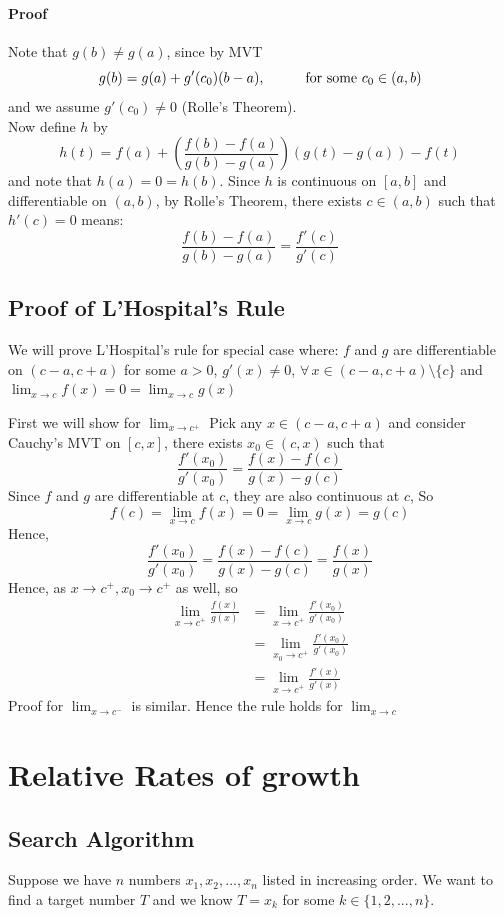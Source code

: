 \documentclass[12pt]{article}
\newcommand\tab[1][1cm]{\hspace*{#1}}
\begin{document}
\paragraph{Proof}
Note that $g(b) \neq g(a)$, since by MVT
\[
    g(b) = g(a) + g'(c_0)(b - a), \textrm{\tab for some } c_0 \in (a, b)
\]
and we assume $g'(c_0) \neq 0$ (Rolle's Theorem). \\
Now define $h$ by 
\[
    h(t) = f(a) + \left(\frac{f(b) - f(a)}{g(b) - g(a)} \right)(g(t) - g(a)) - f(t)
\]
and note that $h(a) = 0 = h(b)$. Since $h$ is continuous on $[a, b]$ and differentiable on $(a, b)$, by 
Rolle's Theorem, there exists $c \in (a, b)$ such that $h'(c) = 0$ means:
\[
    \frac{f(b) - f(a)}{g(b) - g(a)} = \frac{f'(c)}{g'(c)} 
\]
\subsection{Proof of L'Hospital's Rule}
We will prove L'Hospital's rule for special case where: $f$ and $g$ are differentiable on $(c - a, c + a)$ for some $a > 0$,
$g'(x) \neq 0$, $\forall \, x \in (c- a, c + a)\setminus\{c\}$ and $\lim_{x \to c} f(x) = 0 = \lim_{x \to c} g(x)$

\noindent
First we will show for $\lim_{x \to c^+}$ Pick any $x \in (c - a, c + a)$ and consider Cauchy's MVT on $[c, x]$, there exists $x_0 \in (c, x)$ such that
\[
    \frac{f'(x_0)}{g'(x_0)} = \frac{f(x) - f(c)}{g(x) - g(c)} 
\]
Since $f$ and $g$ are differentiable at $c$, they are also continuous at $c$, So
\[
    f(c) = \lim_{x \to c} f(x) = 0 = \lim_{x \to c} g(x) = g(c)
\]
Hence, 
\[
    \frac{f'(x_0)}{g'(x_0)} = \frac{f(x) - f(c)}{g(x) - g(c)} = \frac{f(x)}{g(x)} 
\]
Hence, as $x \to c^+, x_0 \to c^+$ as well, so 
\begin{align*} 
    \lim_{x \to c^ + } \frac{f(x)}{g(x)} &= \lim_{x \to c^+} \frac{f'(x_0)}{g'(x_0)} \\ 
    &= \lim_{x_0 \to c^+} \frac{f'(x_0)}{g'(x_0)} \\
    &= \lim_{x \to c^+} \frac{f'(x)}{g'(x)} 
\end{align*}
Proof for $\lim_{x \to c^-}$ is similar. Hence the rule holds for $\lim_{x \to c}$
\section{Relative Rates of growth}
\subsection{Search Algorithm}
Suppose we have $n$ numbers $x_1, x_2, ..., x_n$ listed in increasing order. We want to find a target number $T$ and we know $T = x_k$ for some
$k \in \{1,2,..., n\}$.
\end{document}
